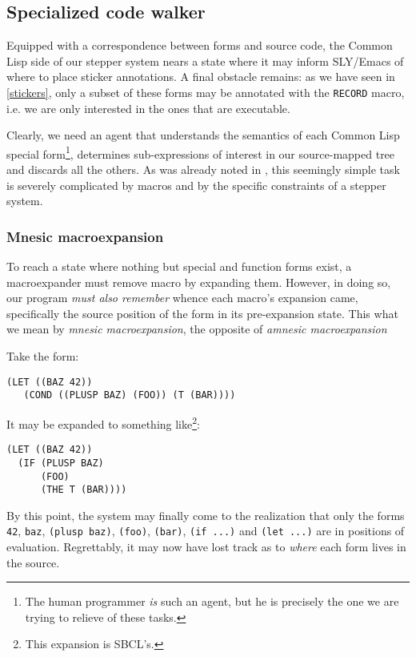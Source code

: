 \documentclass[sigconf]{acmart}
\begin{document}
\subsection{Specialized code walker}

Equipped with a correspondence between forms and source code, the
Common Lisp side of our stepper system nears a state where it may
inform SLY/Emacs of where to place sticker annotations.  A final
obstacle remains: as we have seen in \ref{stickers}, only a subset of
these forms may be annotated with the \texttt{RECORD} macro, i.e. we
are only interested in the ones that are executable.

Clearly, we need an agent that understands the semantics of each
Common Lisp special form\footnote{The human programmer \emph{is} such
  an agent, but he is precisely the one we are trying to relieve of
  these tasks.}, determines sub-expressions of interest in our
source-mapped tree and discards all the others.  As was already noted
in \cite{annotation-based}, this seemingly simple task is severely
complicated by macros and by the specific constraints of a stepper
system.

\subsubsection{Mnesic macroexpansion}

To reach a state where nothing but special and function forms exist, a
macroexpander must remove macro by expanding them.  However, in doing
so, our program \emph{must also remember} whence each macro's
expansion came, specifically the source position of the form in its
pre-expansion state.  This what we mean by \emph{mnesic
  macroexpansion}, the opposite of \emph{amnesic macroexpansion}

Take the form:

\begin{verbatim}
(LET ((BAZ 42))
   (COND ((PLUSP BAZ) (FOO)) (T (BAR))))
\end{verbatim}

It may be expanded to something like\footnote{This expansion is
  SBCL's.}:

\begin{verbatim}
(LET ((BAZ 42))
  (IF (PLUSP BAZ)
      (FOO)
      (THE T (BAR))))
\end{verbatim}

By this point, the system may finally come to the realization that
only the forms \texttt{42}, \texttt{baz}, \texttt{(plusp baz)},
\texttt{(foo)}, \texttt{(bar)}, \texttt{(if ...)} and \texttt{(let
  ...)} are in positions of evaluation.  Regrettably, it may now have
lost track as to \emph{where} each form lives in the source.
\end{document}
